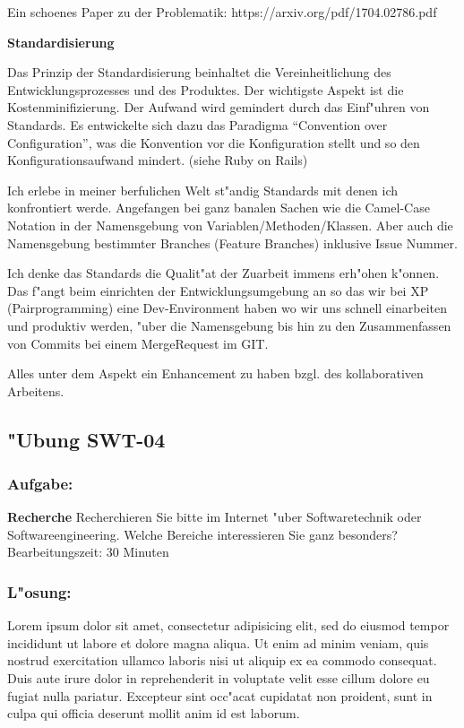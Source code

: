 Ein schoenes Paper zu der Problematik:
https://arxiv.org/pdf/1704.02786.pdf



\textbf{Standardisierung}

Das Prinzip der Standardisierung beinhaltet die Vereinheitlichung des Entwicklungsprozesses und des Produktes. Der wichtigste Aspekt ist die Kostenminifizierung. Der Aufwand wird gemindert durch das Einf"uhren von Standards.
Es entwickelte sich dazu das Paradigma ``Convention over Configuration'', was die Konvention vor die Konfiguration stellt und so den Konfigurationsaufwand mindert. (siehe Ruby on Rails)

Ich erlebe in meiner berfulichen Welt st"andig Standards mit denen ich konfrontiert werde.
Angefangen bei ganz banalen Sachen wie die Camel-Case Notation in der Namensgebung von Variablen/Methoden/Klassen.
Aber auch die Namensgebung bestimmter Branches (Feature Branches) inklusive Issue Nummer.

Ich denke das Standards die Qualit"at der Zuarbeit immens erh"ohen k"onnen.
Das f"angt beim einrichten der Entwicklungsumgebung an so das wir bei XP (Pairprogramming) eine Dev-Environment haben wo wir uns schnell einarbeiten und produktiv werden, "uber die Namensgebung bis hin zu den Zusammenfassen von Commits bei einem MergeRequest im GIT.

Alles unter dem Aspekt ein Enhancement zu haben bzgl. des kollaborativen Arbeitens.


\newpage
\subsection{"Ubung SWT-04}
\subsubsection*{Aufgabe:}

\begin{framed}
\textbf{Recherche}
\smallbreak
Recherchieren Sie bitte im Internet "uber Softwaretechnik oder Softwareengineering. Welche Bereiche interessieren Sie ganz besonders?
\bigbreak
\small Bearbeitungszeit: 30 Minuten
\end{framed}
\bigbreak
\bigbreak
\subsubsection*{L"osung:}
Lorem ipsum dolor sit amet, consectetur adipisicing elit, sed do eiusmod tempor incididunt ut labore et dolore magna aliqua. Ut enim ad minim veniam, quis nostrud exercitation ullamco laboris nisi ut aliquip ex ea commodo consequat. Duis aute irure dolor in reprehenderit in voluptate velit esse cillum dolore eu fugiat nulla pariatur. Excepteur sint occ"acat cupidatat non proident, sunt in culpa qui officia deserunt mollit anim id est laborum.

